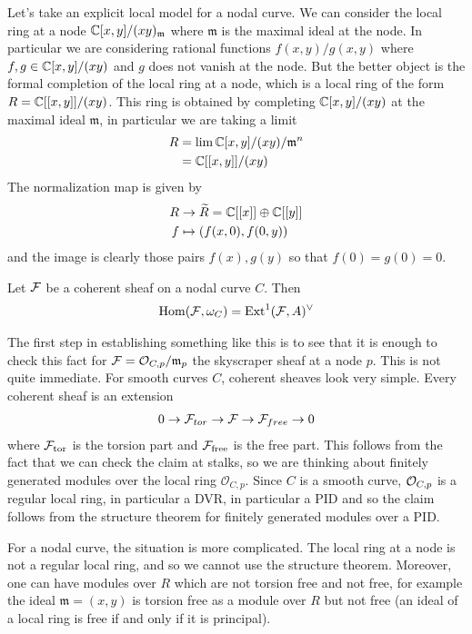 \documentclass[12pt]{article}
\begin{document}
Let's take an explicit local model for a nodal curve. We can consider the local ring at a node $\mathbb{C}[x,y]/(xy)_{\mathfrak{m}}$ where $\mathfrak{m}$ is the maximal ideal at the node. In particular we are considering rational functions $f(x,y)/g(x,y)$ where $f,g \in \mathbb{C}[x,y]/(xy)$ and $g$ does not vanish at the node. But the better object is the formal completion of the local ring at a node, which is a local ring of the form \(R = \mathbb{C}[[x,y]]/(xy)\). This ring is obtained by completing $\mathbb{C}[x,y]/(xy)$ at the maximal ideal $\mathfrak{m}$, in particular we are taking a limit \begin{align*}
    R &= \lim \mathbb{C}[x,y]/(xy) /\mathfrak{m}^n \\
    &= \mathbb{C}[[x,y]]/(xy)
\end{align*}
The normalization map is given by \begin{align*}
    R &\to \widetilde R = \mathbb{C}[[x]] \oplus \mathbb{C}[[y]]  \\
    f &\mapsto (f(x,0), f(0,y))
\end{align*} and the image is clearly those pairs $f(x),g(y)$ so that $f(0) = g(0) = 0$. 
\begin{proposition}
    Let ${\mathcal{F}}$ be a coherent sheaf on a nodal curve $C$. Then \begin{align*}
        \operatorname{Hom}({\mathcal{F}}, \omega_C) &= \operatorname{Ext}^1({\mathcal{F}}, A)^\vee \\
    \end{align*}
\end{proposition}

The first step in establishing something like this is to see that it is enough to check this fact for ${\mathcal{F}} = {\mathcal{O}}_{C,p}/\mathfrak{m}_p$ the skyscraper sheaf at a node $p$. This is not quite immediate. For smooth curves $C$, coherent sheaves look very simple. Every coherent sheaf is an extension \begin{align*}
    0 \to {\mathcal{F}}_{tor} \to {\mathcal{F}} \to {\mathcal{F}}_{free} \to 0
\end{align*} where ${\mathcal{F}}_{\text{tor}}$ is the torsion part and ${\mathcal{F}}_{\text{free}}$ is the free part. This follows from the fact that we can check the claim at stalks, so we are thinking about finitely generated modules over the local ring $\mathcal{O}_{C,p}$. Since $C$ is a smooth curve, ${\mathcal{O}}_{C,p}$ is a regular local ring, in particular a DVR, in particular a PID and so the claim follows from the structure theorem for finitely generated modules over a PID.

For a nodal curve, the situation is more complicated. The local ring at a node is not a regular local ring, and so we cannot use the structure theorem. Moreover, one can have modules over $R$ which are not torsion free and not free, for example the ideal $\mathfrak{m} = (x,y)$ is torsion free as a module over $R$ but not free (an ideal of a local ring is free if and only if it is principal).
\end{document}
